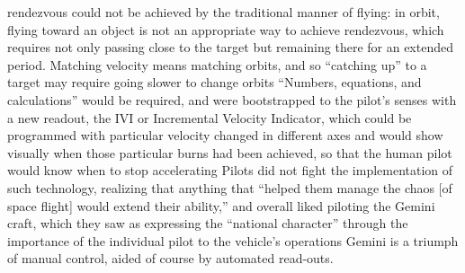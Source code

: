 rendezvous could not be achieved by the
traditional manner of flying: in orbit, flying toward an object is not
an appropriate way to achieve rendezvous, which requires not only
passing close to the target but remaining there for an extended
period. Matching velocity means matching orbits, and so ``catching
up'' to a target may require going slower to change orbits\cite[p.
  86]{???-DM} ``Numbers, equations, and calculations'' would be
required, and were bootstrapped to the pilot's senses with a new
readout, the IVI or Incremental Velocity Indicator, which could be
programmed with particular velocity changed in different axes and
would show visually when those particular burns had been achieved,
so that the human pilot would know when to stop accelerating\cite[p.
  86-87]{???-DM} Pilots did not fight the implementation of such
technology, realizing that anything that ``helped them manage the
chaos [of space flight] would extend their ability,'' and overall
liked piloting the Gemini craft, which they saw as expressing the
``national character'' through the importance of the individual pilot
to the vehicle's operations\cite[p. 88]{???-DM} Gemini is 
a triumph of manual control, aided of course by automated read-outs.

